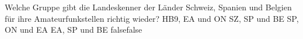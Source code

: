     {Welche Gruppe gibt die Landeskenner der Länder Schweiz, Spanien und Belgien für ihre Amateurfunkstellen richtig wieder?}
    {HB9, EA und ON}
    {SZ, SP und BE}
    {SP, ON und EA}
    {EA, SP und BE}
    {false}{false}